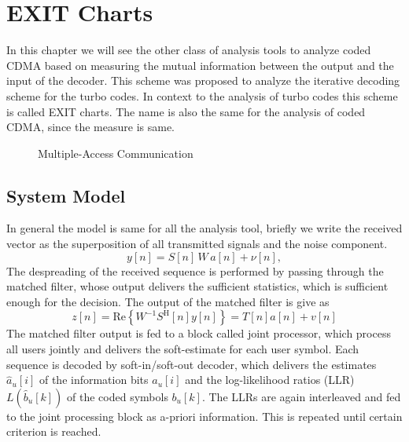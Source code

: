 \chapter{EXIT Charts}
In this chapter we will see the other class of analysis tools to analyze coded CDMA based on measuring the mutual information between the output and the input of the decoder. This scheme was proposed to analyze the iterative decoding scheme for the turbo codes. In context to the analysis of turbo codes this scheme is called EXIT charts. The name is also the same for the analysis of coded CDMA, since the measure is same.
\begin{figure}[htb]
  \centerline{  }
  \caption{Multiple-Access Communication}
\end{figure}
\section{System Model}
In general the model is same for all the analysis tool, briefly we write the received vector as the superposition of all transmitted signals and the noise component.
\begin{equation}
y[n]=S[n]\,W\,a[n]+\nu[n],
\end{equation}
The despreading of the received sequence is performed by passing through the matched filter, whose output delivers the sufficient statistics, which is sufficient enough for the decision. The output of the matched filter is give as
\begin{equation}
z[n]=\mathrm{Re}\left\{W^{-1}S^{\mathrm{H}}[n]y[n]\right\}=T[n]a[n]+v[n]
\end{equation}
The matched filter output is fed to a block called joint processor, which process all users jointly and delivers the soft-estimate for each user symbol. Each sequence is decoded by soft-in/soft-out decoder, which delivers the estimates $\hat{a}_u[i]$ of the information bits $a_u[i]$ and the log-likelihood ratios (LLR) $L(\hat{b}_u[k])$ of the coded symbols $b_u[k]$. The LLRs are again interleaved and fed to the joint processing block as a-priori information. This is repeated until certain criterion is reached.
